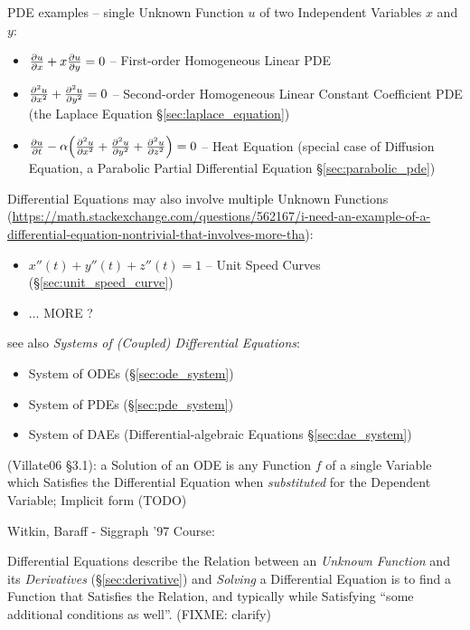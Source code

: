 PDE examples -- single Unknown Function $u$ of two Independent Variables $x$ and
$y$:
\begin{itemize}
\item $\frac{\partial{u}}{\partial{x}} + x\frac{\partial{u}}{\partial{y}} = 0$ -- First-order Homogeneous Linear PDE
\item $\frac{\partial{^2u}}{\partial{x^2}} + \frac{\partial{^2u}}{\partial{y^2}} = 0$ -- Second-order Homogeneous
  Linear Constant Coefficient PDE (the Laplace Equation
  \S\ref{sec:laplace_equation})
\item $\frac{\partial{u}}{\partial{t}} - \alpha\Big(
      \frac{\partial{^2u}}{\partial{x^2}} + \frac{\partial{^2u}}{\partial{y^2}} + \frac{\partial{^2u}}{\partial{z^2}}
    \Big) = 0$ -- Heat Equation (special case of Diffusion Equation, a Parabolic
    Partial Differential Equation \S\ref{sec:parabolic_pde})
\end{itemize}

Differential Equations may also involve multiple Unknown Functions
(\url{https://math.stackexchange.com/questions/562167/i-need-an-example-of-a-differential-equation-nontrivial-that-involves-more-tha}):
\begin{itemize}
  \item $x''(t) + y''(t) + z''(t) = 1$ -- Unit Speed Curves
    (\S\ref{sec:unit_speed_curve})
  \item ... MORE ?
\end{itemize}

see also \emph{Systems of (Coupled) Differential Equations}:
\begin{itemize}
  \item System of ODEs (\S\ref{sec:ode_system})
  \item System of PDEs (\S\ref{sec:pde_system})
  \item System of DAEs (Differential-algebraic Equations \S\ref{sec:dae_system})
\end{itemize}

(Villate06 \S 3.1): a Solution of an ODE is any Function $f$ of a single
Variable which Satisfies the Differential Equation when \emph{substituted} for
the Dependent Variable; Implicit form (TODO)

Witkin, Baraff - Siggraph '97 Course:

Differential Equations describe the Relation between an \emph{Unknown Function}
and its \emph{Derivatives} (\S\ref{sec:derivative}) and \emph{Solving} a
Differential Equation is to find a Function that Satisfies the Relation, and
typically while Satisfying ``some additional conditions as well''. (FIXME:
clarify)

\asterism

